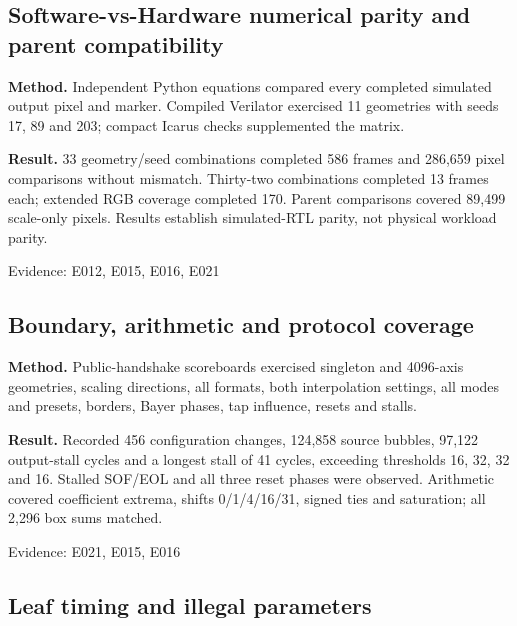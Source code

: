 \documentclass[11pt,a4paper]{article}
\begin{document}
\subsection{Software-vs-Hardware numerical parity and parent compatibility}

\textbf{Method.} Independent Python equations compared every completed simulated output pixel and marker. Compiled Verilator exercised 11 geometries with seeds 17,\allowbreak{} 89 and 203; compact Icarus checks supplemented the matrix.

\textbf{Result.} 33 geometry/\allowbreak{}seed combinations completed 586 frames and 286,\allowbreak{}659 pixel comparisons without mismatch. Thirty-two combinations completed 13 frames each; extended RGB coverage completed 170. Parent comparisons covered 89,\allowbreak{}499 scale-only pixels. Results establish simulated-RTL parity,\allowbreak{} not physical workload parity.

{\small Evidence: E012,\allowbreak{} E015,\allowbreak{} E016,\allowbreak{} E021}

\subsection{Boundary,\allowbreak{} arithmetic and protocol coverage}

\textbf{Method.} Public-handshake scoreboards exercised singleton and 4096-axis geometries,\allowbreak{} scaling directions,\allowbreak{} all formats,\allowbreak{} both interpolation settings,\allowbreak{} all modes and presets,\allowbreak{} borders,\allowbreak{} Bayer phases,\allowbreak{} tap influence,\allowbreak{} resets and stalls.

\textbf{Result.} Recorded 456 configuration changes,\allowbreak{} 124,\allowbreak{}858 source bubbles,\allowbreak{} 97,\allowbreak{}122 output-stall cycles and a longest stall of 41 cycles,\allowbreak{} exceeding thresholds 16,\allowbreak{} 32,\allowbreak{} 32 and 16. Stalled SOF/\allowbreak{}EOL and all three reset phases were observed. Arithmetic covered coefficient extrema,\allowbreak{} shifts 0/\allowbreak{}1/\allowbreak{}4/\allowbreak{}16/\allowbreak{}31,\allowbreak{} signed ties and saturation; all 2,\allowbreak{}296 box sums matched.

{\small Evidence: E021,\allowbreak{} E015,\allowbreak{} E016}

\subsection{Leaf timing and illegal parameters}
\end{document}
